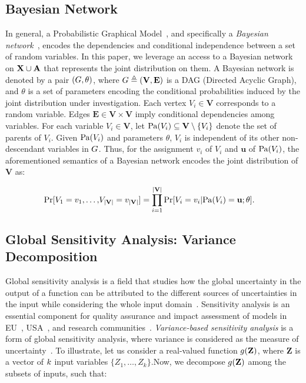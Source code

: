 \subsection*{Bayesian Network}
In general, a Probabilistic Graphical Model~\cite{koller2009probabilistic}, and specifically a \textit{Bayesian network}~\cite{pearl1985bayesian,chavira2008probabilistic}, encodes the dependencies and conditional independence between a set of random variables. In this paper, we leverage an access to a Bayesian network on $ \mathbf{X} \cup \mathbf{A} $ that represents the joint distribution on them. 	A Bayesian network is denoted by a pair $ (G, \theta)$, where $ G \triangleq (\mathbf{V}, \mathbf{E}) $ is a DAG (Directed Acyclic Graph), and $\theta$ is a set of parameters encoding the conditional probabilities induced by the joint distribution under investigation. Each vertex $V_i \in \mathbf{V}$ corresponds to a random variable. Edges $ \mathbf{E} \in \mathbf{V} \times \mathbf{V} $ imply conditional dependencies among variables. For each variable $ V_i \in \mathbf{V} $, let $ \mathrm{Pa}(V_i) \subseteq \mathbf{V} \setminus \{V_i\} $ denote the set of parents of $ V_i $. Given $\mathrm{Pa}(V_i)$ and parameters $\theta$, $ V_i $ is independent of its other non-descendant variables in $G$. Thus, for the assignment $ v_i $ of $ V_i $ and $ \mathbf{u} $ of $ \mathrm{Pa}(V_i) $, the aforementioned semantics of a Bayesian network encodes the joint distribution of $\mathbf{V}$ as:

\begin{equation}
\begin{split}
\Pr[V_1=v_1, \dots, &V_{|\mathbf{V}|}=v_{|\mathbf{V}|}] = \prod_{i=1}^{|\mathbf{V}|} \Pr[V_i = v_i | \mathrm{Pa}(V_i) = \mathbf{u}; \theta].
\end{split}
\label{fvgm_eq:BN}
\end{equation}


\subsection*{Global Sensitivity Analysis: Variance Decomposition}
Global sensitivity analysis is a field that studies how the global uncertainty in the output of a function can be attributed to the different sources of uncertainties in the input while considering the whole input domain~\cite{saltelli2008global}.
Sensitivity analysis is an essential component for quality assurance and impact assessment of models in EU~\cite{eu}, USA~\cite{usepa}, and research communities~\cite{saltelli2020five}.
\emph{Variance-based sensitivity analysis} is a form of global sensitivity analysis, where variance is considered as the measure of uncertainty~\cite{sobol1990sensitivity,sobol2001global}. To illustrate, let us consider a real-valued function $  g(\mathbf{Z}) $, where $ \mathbf{Z} $ is a vector of $ k $ input variables $ \{Z_1, \dots, Z_k\} $.Now, we decompose $ g(\mathbf{Z}) $ among the subsets of inputs, such that:

